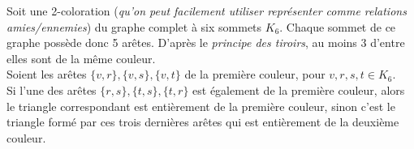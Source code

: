 \documentclass[fontsize=10pt]{article}
\begin{document}
Soit une 2-coloration (\textit{qu'on peut facilement utiliser représenter comme relations amies/ennemies}) du graphe complet à six sommets $K_6$.
Chaque sommet de ce graphe possède donc 5 arêtes. D'après le \textit{principe des tiroirs}, au moins 3 d'entre elles sont de la même couleur.\\
Soient les arêtes $\{v,r\}, \{v,s\}, \{v,t\}$ de la première couleur, pour $v,r,s,t \in K_6$.\\
Si l'une des arêtes $\{r,s\}, \{t,s\}, \{t,r\}$ est également de la première couleur, alors le triangle correspondant est entièrement de la première couleur, sinon c'est le triangle formé par ces trois dernières arêtes qui est entièrement de la deuxième couleur.
\end{document}
